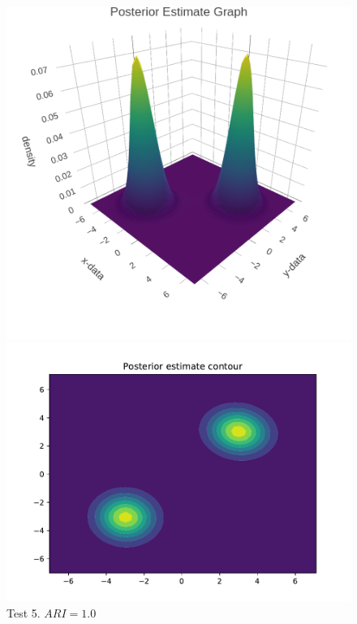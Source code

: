 \begin{figure}[h]
	\centering
	\begin{minipage}{0.5\textwidth}
		\includegraphics[scale=0.5]{etc/test5_dens.png}
	\end{minipage}%
	\begin{minipage}{0.5\textwidth}
		\includegraphics[scale=0.5]{etc/test5_cont.pdf}
	\end{minipage}
	\captionsetup{labelformat=empty}
	\caption{Test 5. $ARI = 1.0$}
\end{figure}


